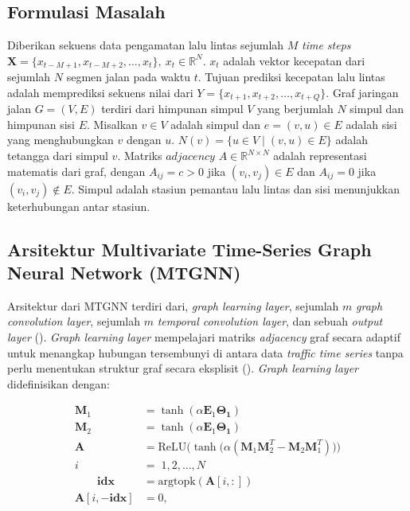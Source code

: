 \subsection{Formulasi Masalah}
\label{subsec:traffic-forecasting-problem-formulation}
Diberikan sekuens data pengamatan lalu lintas sejumlah $M$ \textit{time steps} $\textbf{X}=\{x_{t-M+1},x_{t-M+2},\ldots,x_{t} \}, \ x_t\in \mathbb{R}^N$. $x_t$ adalah vektor kecepatan dari sejumlah $N$ segmen jalan pada waktu $t$. Tujuan prediksi kecepatan lalu lintas adalah memprediksi sekuens nilai dari $Y=\{x_{t+1},x_{t+2},\ldots,x_{t+Q}\}$. Graf jaringan jalan $G=(V,E)$ terdiri dari himpunan simpul $V$ yang berjumlah $N$ simpul dan himpunan sisi $E$. Misalkan $v\in V$ adalah simpul dan $e=(v,u)\in E$ adalah sisi yang menghubungkan $v$ dengan $u$. $N(v)=\{u\in V\mid (v,u)\in E\}$ adalah tetangga dari simpul $v$. Matriks $adjacency$ $A\in \mathbb{R}^{N\times N}$ adalah representasi matematis dari graf, dengan $A_{ij}=c>0$ jika $(v_i,v_j)\in E$ dan $A_{ij}=0$ jika $(v_i,v_j)\notin E$. Simpul adalah stasiun pemantau lalu lintas dan sisi menunjukkan keterhubungan antar stasiun.

\subsection{Arsitektur Multivariate Time-Series Graph Neural Network (MTGNN)}
\label{subsec:traffic-forecasting-mtgnn-architecture}
Arsitektur dari MTGNN terdiri dari, \textit{graph learning layer}, sejumlah $m$ \textit{graph convolution layer}, sejumlah $m$ \textit{temporal convolution layer}, dan sebuah \textit{output layer} (\cite{Wu2020}). \textit{Graph learning layer} mempelajari matriks \textit{adjacency} graf secara adaptif untuk menangkap hubungan tersembunyi di antara data \textit{traffic time series} tanpa perlu menentukan struktur graf secara eksplisit (\cite{Wu2020}). \textit{Graph learning layer} didefinisikan dengan:

\begin{align}
    \mathbf{M}_1 &= \tanh(\alpha \mathbf{E}_1 \mathbf{\Theta_1})\\
    \mathbf{M}_2 &= \tanh(\alpha \mathbf{E}_1 \mathbf{\Theta_1})\\
    \mathbf{A} &= \mathrm{ReLU}\bigl(\tanh\bigl(\alpha(\mathbf{M}_1\mathbf{M}_2^{T}-\mathbf{M}_2\mathbf{M}_1^{T})\bigr)\bigr) \\ 
    i \; &= \; 1,2,\ldots,N \\
   \hspace{2em}  \mathbf{idx} &= \mathrm{argtopk}(\mathbf{A}[i,:])\\
     \mathbf{A}[i,-\mathbf{idx}] &= 0, 
\end{align}

